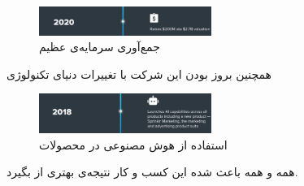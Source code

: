 \documentclass[dvipsnames, svgnames, x11names, 11pt, twocolumn]{article}
\begin{document}
\begin{figure}[H]
\begin{center}
\includegraphics[width=0.5\textwidth, height=0.05\textheight]{images/sp-fund-2}
\caption{جمع‌آوری سرمایه‌ی عظیم}
\end{center}
\end{figure}

همچنین بروز بودن این شرکت با تغییرات دنیای تکنولوژی 
\begin{figure}[H]
\begin{center}
\includegraphics[width=0.5\textwidth, height=0.05\textheight]{images/sp-ai}
\caption{استفاده از هوش مصنوعی در محصولات}
\end{center}
\end{figure}

همه و همه باعث شده این کسب و کار نتیجه‌ی بهتری از 
بگیرد.
\end{document}
